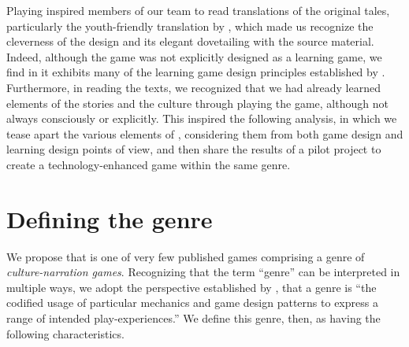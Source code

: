 \documentclass[a4paper]{article}
\begin{document}
Playing \totan{}  inspired members of our team to read translations
of the original tales,
particularly  the youth-friendly translation by \citep{Neil1994},
which made us recognize the cleverness of the design
and its elegant dovetailing with the source material.
Indeed, although the game was not explicitly designed as a learning game,
we find in it exhibits many of the learning game design principles
established by \citet{Klopfer2009}.
Furthermore, in reading the texts, we recognized that we had already
learned elements of the stories and the culture through playing the game,
although not always consciously or explicitly.
This inspired the following analysis, in which we tease apart the
various elements of \totan{}, considering them from both game design
and learning design points of view, and then share the results of a pilot
project to create a technology-enhanced game within the same genre.

\section{Defining the genre}

We propose that \totan{} is one of very few published games comprising a genre
of \textit{culture-narration games}. Recognizing that the term ``genre''
can be interpreted in multiple ways, we adopt the perspective established
by \citet{Arsenault2009},
that a genre is ``the codified usage of particular mechanics
and game design patterns to express a range of intended play-experiences.''
We define this genre, then, as having the following characteristics.
\end{document}
